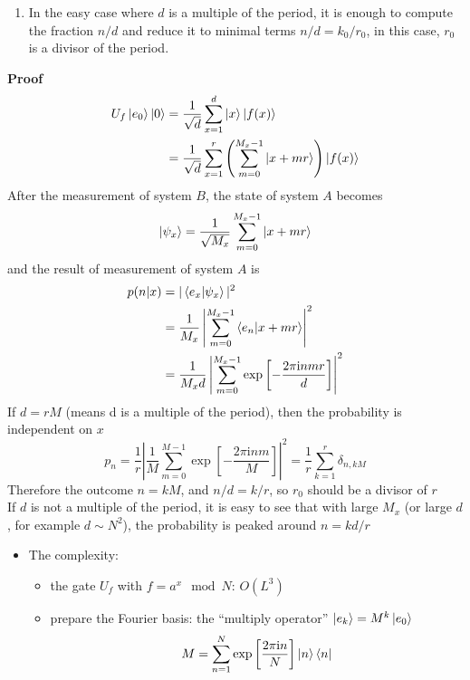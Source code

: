 \documentclass[11pt,a4paper]{article}%
\numberwithin{equation}{section}
\newcommand\mi{\mathrm{i}}
\begin{document}
\begin{enumerate}
\begin{enumerate}
        \item In the easy case where $d$ is a multiple of the period, it is enough to compute the fraction $n/d$ and reduce it to minimal terms $n/d = k_0/r_0$, in this case, $r_0$ is a divisor of the period.
    \end{enumerate}
    \textbf{Proof}
    \begin{align}
        U_f\ket{e_0}\ket0 &= \frac 1{\sqrt d}\sum_{x=1}^d\ket x\ket{f(x)} \\
        &= \frac 1{\sqrt d}\sum_{x=1}^r\left(\sum_{m=0}^{M_x-1}\ket{x+mr}\right)\ket{f(x)}
    \end{align}
    After the measurement of system $B$, the state of system $A$ becomes
    \begin{equation}
        \ket{\psi_x} = \frac 1{\sqrt{M_x}}\sum_{m=0}^{M_x-1}\ket{x+mr}
    \end{equation}
    and the result of measurement of system $A$ is 
    \begin{align}
        p(n|x) &= |\braket{e_x|\psi_x}|^2 \\
        &= \frac 1{M_x}\left|\sum_{m=0}^{M_x-1}\braket{e_n|x+mr}\right|^2 \\
        &= \frac 1{M_x d}\left|\sum_{m=0}^{M_x-1}\exp\left[-\frac{2\pi\mi nmr}d\right]\right|^2
    \end{align}
    If $d = rM$ (means d is a multiple of the period), then the probability is independent on $x$
    \begin{equation}
        p_n = \frac 1r\left|\frac 1M\sum_{m=0}^{M-1}\exp\left[-\frac{2\pi\mi nm}M\right]\right|^2 = \frac 1r\sum_{k=1}^r \delta_{n,kM}
    \end{equation}
    Therefore the outcome $n = kM$, and $n/d = k/r$, so $r_0$ should be a divisor of $r$\\
    If $d$ is not a multiple of the period, it is easy to see that with large $M_x$ (or large $d$, for example $d\sim N^2$), the probability is peaked around $n = kd/r$
    \begin{itemize}
        \item The complexity:
        \begin{itemize}
            \item the gate $U_f$ with $f = a^x\mod N$: $O(L^3)$
            \item prepare the Fourier basis: the ``multiply operator'' $\ket{e_k} = M^k\ket{e_0}$
            \begin{equation}
                M = \sum_{n=1}^N\exp\left[\frac{2\pi\mi n}N\right]\ket n\bra n

\end{equation}
\end{itemize}
\end{itemize}
\end{enumerate}
\end{document}
